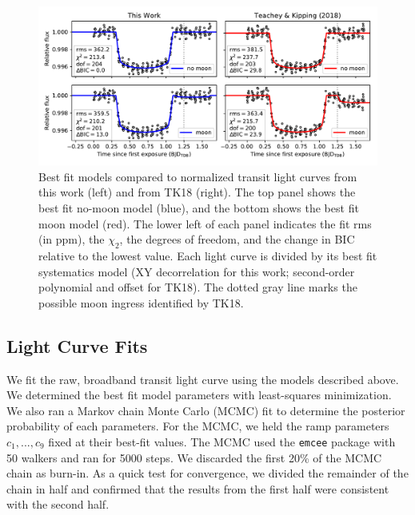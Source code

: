 \documentclass[twocolumn]{aastex62}
\begin{document}

\begin{figure}
\includegraphics[width = 1.0 \textwidth]{figures/fig3_bestfits.pdf}
    \caption{Best fit models compared to normalized transit light curves from this work (left) and from TK18 (right). The top panel shows the best fit no-moon model (blue), and the bottom shows the best fit moon model (red). The lower left of each panel indicates the fit rms (in ppm), the $\chi_2$, the degrees of freedom, and the change in BIC relative to the lowest value.  Each light curve is divided by its best fit systematics model (XY decorrelation for this work; second-order polynomial and offset for TK18).  The dotted gray line marks the possible moon ingress identified by TK18.}
\label{fig:bestfit}
\end{figure}

\subsection{Light Curve Fits}
We fit the raw, broadband transit light curve using the models described above.  We determined the best fit model parameters with least-squares minimization.  We also ran a Markov chain Monte Carlo (MCMC) fit to determine the posterior probability of each parameters. For the MCMC, we held the ramp parameters $c_1, ..., c_9$ fixed at their best-fit values.  The MCMC used the \texttt{emcee} package \citep{foremanmackey13} with 50 walkers and ran for 5000 steps. We discarded the first 20\% of the MCMC chain as burn-in. As a quick test for convergence, we divided the remainder of the chain in half and confirmed that the results from the first half were consistent with the second half.
\end{document}
